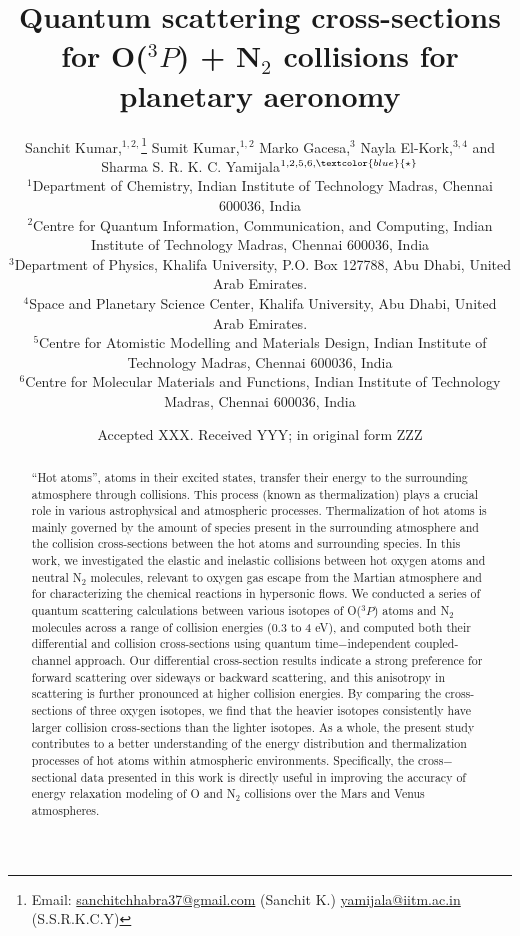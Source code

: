 \documentclass[fleqn,usenatbib]{mnras}
\title[O($^3P$) + N$_2$ scattering cross-sections]{Quantum scattering cross-sections for O($^3P$) + N$_2$ collisions for planetary aeronomy}
\author[Kumar, Kumar, and Yamijala]{
Sanchit Kumar,$^{1,2,}$\thanks{Email: \url{sanchitchhabra37@gmail.com} (Sanchit K.) \hfill \break
\hspace*{1.1cm}\url{yamijala@iitm.ac.in} (S.S.R.K.C.Y)}
Sumit Kumar,$^{1,2}$
Marko Gacesa,$^{3}$ 
Nayla El-Kork,$^{3,4}$
and Sharma S. R. K. C. Yamijala$^{1,2,5,6, \textcolor{blue}{\star}}$
\\
$^{1}$Department of Chemistry, Indian Institute of Technology Madras, Chennai 600036, India \\
$^{2}$Centre for Quantum Information, Communication, and Computing, Indian Institute of Technology Madras, Chennai 600036, India \\
$^{3}$Department of Physics, Khalifa University, P.O. Box 127788, Abu Dhabi, United Arab Emirates. \\
$^{4}$Space and Planetary Science Center, Khalifa University, Abu Dhabi, United Arab Emirates. \\
$^{5}$Centre for Atomistic Modelling and Materials Design, Indian Institute of Technology Madras, Chennai 600036, India \\
$^{6}$Centre for Molecular Materials and Functions, Indian Institute of Technology Madras, Chennai 600036, India \\
}
\date{Accepted XXX. Received YYY; in original form ZZZ}
\begin{document}
\label{firstpage}
\pagerange{\pageref{firstpage}--\pageref{lastpage}}
\maketitle


\begin{abstract}
“Hot atoms”, atoms in their excited states, transfer their energy to the surrounding atmosphere through collisions. This process (known as thermalization) plays a crucial role in various astrophysical and atmospheric processes. Thermalization of hot atoms is mainly governed by the amount of species present in the surrounding atmosphere and the collision cross-sections between the hot atoms and surrounding species. In this work, we investigated the elastic and inelastic collisions between hot oxygen atoms and neutral N$_2$ molecules, relevant to oxygen gas escape from the Martian atmosphere and for characterizing the chemical reactions in hypersonic flows. We conducted a series of quantum scattering calculations between various isotopes of O($^3P$) atoms and N$_2$ molecules across a range of collision energies (0.3 to 4 eV), and computed both their differential and collision cross-sections using quantum time$-$independent coupled-channel approach. Our differential cross-section results indicate a strong preference for forward scattering over sideways or backward scattering, and this anisotropy in scattering is further pronounced at higher collision energies. By comparing the cross-sections of three oxygen isotopes, we find that the heavier isotopes consistently have larger collision cross-sections than the lighter isotopes. As a whole, the present study contributes to a better understanding of the energy distribution and thermalization processes of hot atoms within atmospheric environments. Specifically, the cross$-$sectional data presented in this work is directly useful in improving the accuracy of energy relaxation modeling of O and N$_2$ collisions over the Mars and Venus atmospheres. 



\end{abstract}
\end{document}
